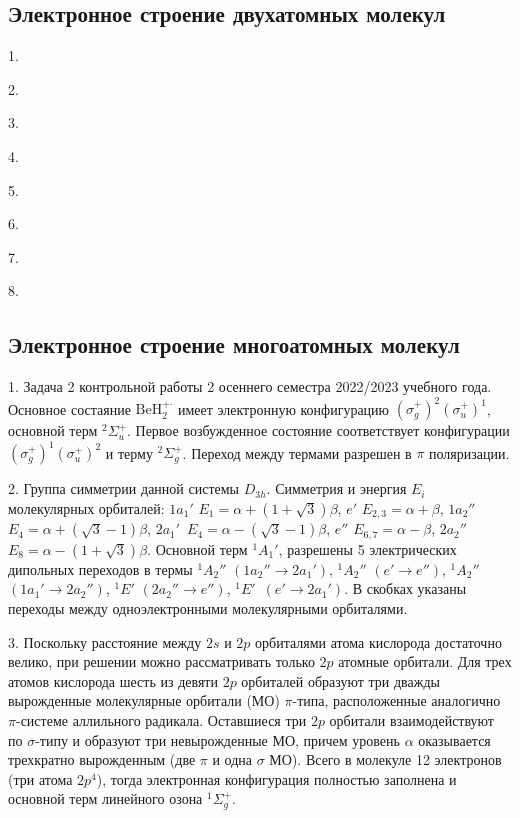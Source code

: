 \subsection{Электронное строение двухатомных молекул}
1. \par
2. \par
3. \par
4. \par
5. \par
6. \par
7. \par
8. \par
\newpage

\subsection{Электронное строение многоатомных молекул}
1. Задача 2 контрольной работы 2 осеннего семестра 2022/2023 учебного года. Основное состаяние $\text{BeH}_2^{+\boldsymbol{\cdot}}$ имеет электронную конфигурацию $(\sigma_g^+)^2 (\sigma_u^+)^1$, основной терм $^2\Sigma_u^+$. Первое возбужденное состояние соответствует конфигурации $(\sigma_g^+)^1 (\sigma_u^+)^2$ и терму $^2\Sigma_g^+$. Переход между термами разрешен в $\pi$ поляризации.\par
2. Группа симметрии данной системы $D_{3h}$. Симметрия и энергия $E_i$ молекулярных орбиталей: $1a_1'$ $E_1=\alpha+(1+\sqrt3)\beta$, $e'$ $E_{2,3}=\alpha+\beta$, $1a_2''$ $E_4=\alpha+(\sqrt3-1)\beta$, $2a_1'$~$E_4=\alpha-(\sqrt3-1)\beta$, $e''$ $E_{6,7}=\alpha-\beta$, $2a_2''$~$E_8=\alpha-(1+\sqrt3)\beta$. Основной терм $^1A_1'$, разрешены 5 электрических дипольных переходов в термы $^1A_2''$ $(1a_2'' \rightarrow 2a_1')$, $^1A_2''$ $(e' \rightarrow e'')$, $^1A_2''$ $(1a_1' \rightarrow 2a_2'')$, $^1E'$ $(2a_2'' \rightarrow e'')$, $^1E'$~$(e' \rightarrow 2a_1')$. В скобках указаны переходы между одноэлектронными молекулярными орбиталями.\par
3. Поскольку расстояние между  $2s$ и $2p$ орбиталями атома кислорода достаточно велико, при решении можно рассматривать только $2p$ атомные орбитали. Для трех атомов кислорода шесть из девяти $2p$ орбиталей образуют три дважды вырожденные молекулярные орбитали (МО) $\pi$-типа, расположенные аналогично $\pi$-системе аллильного радикала. Оставшиеся три $2p$ орбитали взаимодействуют по $\sigma$-типу и образуют три невырожденные МО, причем уровень $\alpha$ оказывается трехкратно вырожденным (две $\pi$ и одна $\sigma$ МО). Всего в молекуле 12 электронов (три атома $2p^4$), тогда электронная конфигурация полностью заполнена и основной терм линейного озона $^1\Sigma_g^+$. \par
